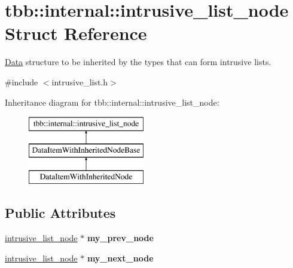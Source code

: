 \hypertarget{structtbb_1_1internal_1_1intrusive__list__node}{}\section{tbb\+:\+:internal\+:\+:intrusive\+\_\+list\+\_\+node Struct Reference}
\label{structtbb_1_1internal_1_1intrusive__list__node}


\hyperlink{classData}{Data} structure to be inherited by the types that can form intrusive lists.  




{\ttfamily \#include $<$intrusive\+\_\+list.\+h$>$}

Inheritance diagram for tbb\+:\+:internal\+:\+:intrusive\+\_\+list\+\_\+node\+:\begin{figure}[H]
\begin{center}
\leavevmode
\includegraphics[height=3.000000cm]{structtbb_1_1internal_1_1intrusive__list__node}
\end{center}
\end{figure}
\subsection*{Public Attributes}
\begin{DoxyCompactItemize}
\item 
\hypertarget{structtbb_1_1internal_1_1intrusive__list__node_a35bf2ac45f7e99aab397d8ea40202ab8}{}\hyperlink{structtbb_1_1internal_1_1intrusive__list__node}{intrusive\+\_\+list\+\_\+node} $\ast$ {\bfseries my\+\_\+prev\+\_\+node}\label{structtbb_1_1internal_1_1intrusive__list__node_a35bf2ac45f7e99aab397d8ea40202ab8}

\item 
\hypertarget{structtbb_1_1internal_1_1intrusive__list__node_a4b6cb765d8507ed7440b4db424bc6c70}{}\hyperlink{structtbb_1_1internal_1_1intrusive__list__node}{intrusive\+\_\+list\+\_\+node} $\ast$ {\bfseries my\+\_\+next\+\_\+node}\label{structtbb_1_1internal_1_1intrusive__list__node_a4b6cb765d8507ed7440b4db424bc6c70}

\end{DoxyCompactItemize}


